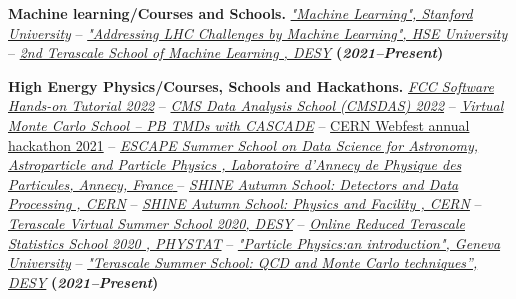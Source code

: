 \documentclass[11pt]{res}
\begin{document}
\begin{resume}
\textbf{Machine learning/Courses and Schools.}
\href{https://www.coursera.org/account/accomplishments/verify/DRRN6452E8WB?utm_product=course}{\textit{"Machine Learning", Stanford University}} -- \href{https://www.coursera.org/account/accomplishments/certificate/MY4HQAEAYL9D}{\textit{"Addressing LHC Challenges by Machine Learning",  HSE University}} -- \href{https://drive.google.com/file/d/11AAS10GLKvA5oR2oZmcjLj1YBwBevQue/view?usp=sharing}{\textit{2nd Terascale School of Machine Learning , DESY}} \textbf{(\textit{2021--Present})}

\textbf{High Energy Physics/Courses, Schools and Hackathons.}
\href{https://indico.cern.ch/event/1182767/}{\textit{FCC Software Hands-on Tutorial 2022}} -- \href{https://lpc.fnal.gov/programs/schools-workshops/cmsdas.shtml}{\textit{CMS Data Analysis School (CMSDAS) 2022}} -- \href{https://drive.google.com/file/d/1Ui4phtxuFPd-trfQp6jCmL4qZOgEJvlf/view}{\textit{Virtual Monte Carlo School -- PB TMDs with CASCADE}} -- \href{https://drive.google.com/file/d/14agcBsN5tkP3eKP2QEpU_cq4_jxhDvRT/view?usp=sharing}{CERN Webfest annual hackathon 2021} -- \href{https://drive.google.com/file/d/1D9BjE1nlL8UmRmZ3HQNqC6Cq1OxK0zB-/view?usp=sharing}{\textit{ESCAPE Summer School on Data Science for Astronomy, Astroparticle and Particle Physics , Laboratoire d’Annecy de Physique des Particules, Annecy, France }} -- \href{https://indico.cern.ch/event/964916/overview}{\textit{SHINE Autumn School: Detectors and Data Processing , CERN}} -- \href{https://indico.cern.ch/event/963826/}{\textit{SHINE Autumn School: Physics and Facility , CERN}} -- \href{https://indico.desy.de/event/26403/}{\textit{Terascale Virtual Summer School 2020, DESY}} -- \href{https://indico.desy.de/event/25594/}{\textit{Online Reduced Terascale Statistics School 2020 , PHYSTAT}} -- \href{https://www.coursera.org/account/accomplishments/certificate/CMVH65UHPLR3}{\textit{"Particle Physics:an introduction", Geneva University}} -- \href{https://drive.google.com/file/d/1fxuisoVa6oLr7eA6mWlE-xZxAs_ifsk6/view}{\textit{"Terascale Summer School: QCD and Monte Carlo techniques”, DESY}} \textbf{(\textit{2021--Present})}


\end{resume}
\end{document}

